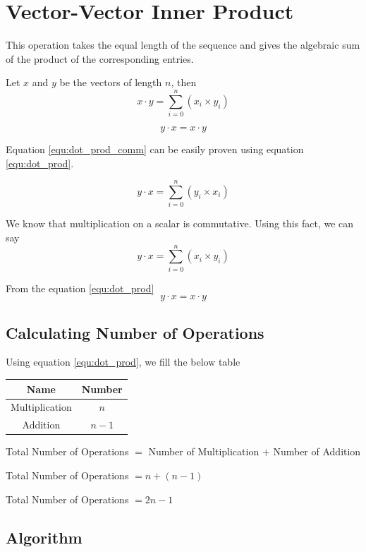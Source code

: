 \chapter{Vector-Vector Inner Product}

This operation takes the equal length of the 
sequence and gives the algebraic sum of the product of the corresponding entries.

Let $x$ and $y$ be the vectors of length $n$, then 
\begin{equation}
    x \cdot y = \sum_{i=0}^{n}(x_i \times y_i)
    \label{equ:dot_prod}
\end{equation}

\begin{equation}
    y \cdot x = x \cdot y
    \label{equ:dot_prod_comm}
\end{equation}

Equation \ref{equ:dot_prod_comm} can be easily proven using equation \ref{equ:dot_prod}.

\[y \cdot x = \sum_{i=0}^{n}(y_i \times x_i)\]

We know that multiplication on a scalar is commutative. Using this fact, we can say
\[y \cdot x = \sum_{i=0}^{n}(x_i \times y_i)\]

From the equation \ref{equ:dot_prod}
\[y \cdot x = x \cdot y\]

\section{Calculating Number of Operations}

Using equation \ref{equ:dot_prod}, we fill the below table

\begin{tabular}{|c|c|}
    \hline
    \textbf{Name} & \textbf{Number} \\
    \hline
    Multiplication & $n$ \\
    \hline
    Addition & $n - 1$ \\
    \hline
\end{tabular}

Total Number of Operations $=$ Number of Multiplication $+$ Number of Addition

Total Number of Operations $= n + (n - 1)$

Total Number of Operations $= 2n - 1$

\section{Algorithm}

